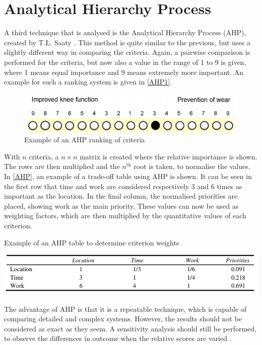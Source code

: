 \section{Analytical Hierarchy Process}
A third technique that is analysed is the Analytical Hierarchy Process (AHP), created by T.L. Saaty \cite{AHP}. This method is quite similar to the previous, but uses a slightly different way in comparing the criteria. Again, a pairwise comparison is performed for the criteria, but now also a value in the range of 1 to 9 is given, where 1 means equal importance and 9 means extremely more important. An example for such a ranking system is given in \autoref{AHP1}.

\begin{figure}[H]
    \centering
    \includegraphics[width=0.75\linewidth]{Figures/AHP1.PNG}
    \captionsetup{justification=centering}
    \caption{Example of an AHP ranking of criteria \cite{AHPtut}}
    \label{AHP1}
\end{figure}

With $n$ criteria, a $n \times n$ matrix is created where the relative importance is shown. The rows are then multiplied and the $n^\text{th}$ root is taken, to normalise the values. In \autoref{AHP}, an example of a trade-off table using AHP is shown. It can be seen in the first row that time and work are considered respectively 3 and 6 times as important as the location. In the final column, the normalised priorities are placed, showing work as the main priority. These values can now be used as weighting factors, which are then multiplied by the quantitative values of each criterion. 

\begin{table}[H]
    \centering
    \captionsetup{justification=centering}
    \caption{Example of an AHP table to determine criterion weights \cite{AHP}} \vspace{-0.2cm}
    \label{AHP}
    \includegraphics[width=0.75\linewidth]{Figures/AHP.PNG}
\end{table}

The advantage of AHP is that it is a repeatable technique, which is capable of comparing detailed and complex systems. However, the results should not be considered as exact as they seem. A sensitivity analysis should still be performed, to observe the differences in outcome when the relative scores are varied \cite{tradeoff}. 

